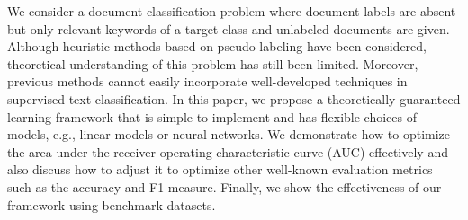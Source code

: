We consider a document classification problem where document labels are absent but only relevant keywords of a target class and unlabeled documents are given. Although heuristic methods based on pseudo-labeling have been considered, theoretical understanding of this problem has still been limited. Moreover, previous methods cannot easily incorporate well-developed techniques in supervised text classification. In this paper, we propose a theoretically guaranteed learning framework that is simple to implement and has flexible choices of models, e.g., linear models or neural networks. We demonstrate how to optimize the area under the receiver operating characteristic curve (AUC) effectively and also discuss how to adjust it to optimize other well-known
evaluation metrics such as the accuracy and F1-measure.
Finally, we show the effectiveness of our framework using benchmark datasets.